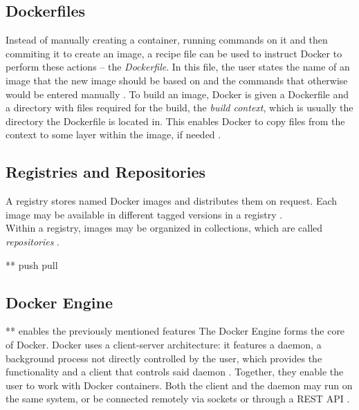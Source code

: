 
  \subsection{Dockerfiles} %
  \label{sub:dockerfiles}
    Instead of manually creating a container, running commands on it and then commiting it to create an image, a recipe file can be used to instruct Docker to perform these actions -- the \emph{Dockerfile}. In this file, the user states the name of an image that the new image should be based on and the commands that otherwise would be entered manually \cite{Docker????Docker}.
    To build an image, Docker is given a Dockerfile and a directory with files required for the build, the \emph{build context}, which is usually the directory the Dockerfile is located in. This enables Docker to copy files from the context to some layer within the image, if needed \cite{Docker????Docker}.

  \subsection{Registries and Repositories} %
  \label{sub:registries_and_repositories}
    A registry stores named Docker images and distributes them on request. Each image may be available in different tagged versions in a registry \cite{Docker????Dockera}. \\
    Within a registry, images may be organized in collections, which are called \emph{repositories} \cite{Docker????Docker}.

    ** push pull



  \subsection{Docker Engine} %
  \label{sub:docker_engine}

  ** enables the previously mentioned features
   The Docker Engine forms the core of Docker.
   Docker uses a client-server architecture: it features a daemon, \ie a background process not directly controlled by the user, which provides the functionality and a client that controls said daemon \cite{Docker????DockerCom}. Together, they enable the user to work with Docker containers. Both the client and the daemon may run on the same system, or be connected remotely via sockets or through a \ac{REST} \ac{API} \cite{Docker????Dockera}.


